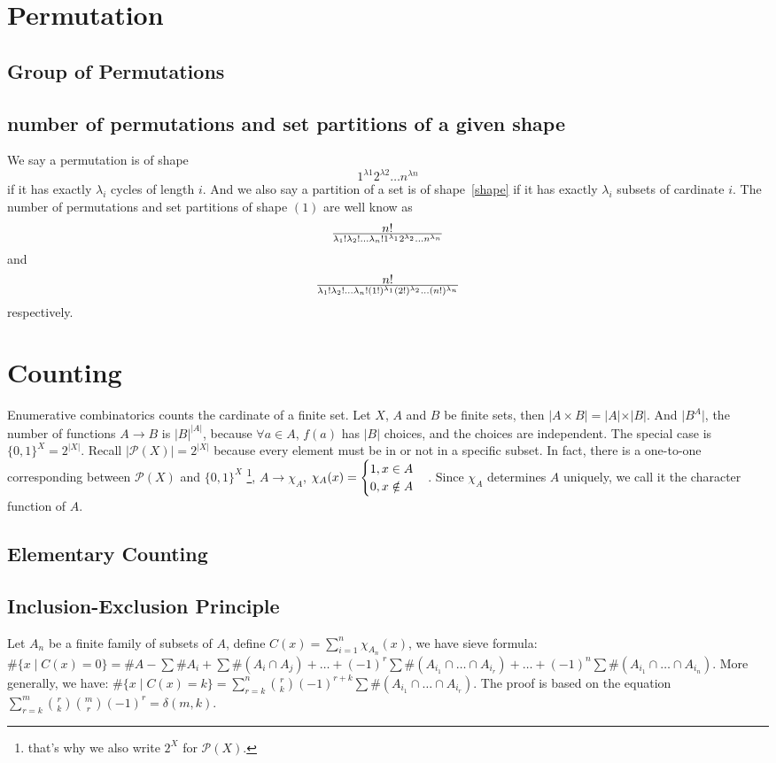 \section{Permutation}
\subsection{Group of Permutations}

\subsection{number of permutations and set partitions of a given shape}
We say a permutation is of shape
$$1^{\lambda 1}2^{\lambda 2} \dots n^{\lambda n} \label{shape}$$
if it has exactly $\lambda_i$ cycles of length $i$.
And we also say a partition of a set is of shape~\ref{shape}
if it has exactly $\lambda_i$ subsets of cardinate $i$.
The number of permutations and set partitions of shape $(1)$
are well know as
$$n! \over \lambda_1! \lambda_2! \dots \lambda_n!
		1^{\lambda_1} 2^{\lambda_2} \dots n^{\lambda_n}$$
and 
$$n! \over \lambda_1! \lambda_2! \dots \lambda_n!
		(1!)^{\lambda_1} (2!)^{\lambda_2} \dots (n!)^{\lambda_n}$$
respectively.

\section{Counting}
Enumerative combinatorics counts the cardinate of a finite set.
Let $X$, $A$ and $B$ be finite sets, then $\vert A\times B\vert=\vert A\vert \times \vert B\vert$.
And $\vert B^{A}\vert$, the number of functions $A\to B$ is $\vert B\vert^{\vert A\vert}$,
because $\forall a\in A$, $f(a)$ has $\vert B\vert$ choices, and the choices are independent.
The special case is $\{0,1\}^{X}=2^{\vert X\vert}$. Recall $\vert \mathcal{P}(X)\vert=2^{\vert X\vert}$
because every element must be in or not in a specific subset.
In fact, there is a one-to-one corresponding between $\mathcal{P}(X)$ and $\{0,1\}^{X}$
\footnote{that's why we also write $2^{X}$ for $\mathcal{P}(X)$.},
$A \to \chi_A$, $\chi_A(x)=\begin{cases}1, x\in A\cr 0, x\notin A\end{cases}$.
Since $\chi_A$ determines $A$ uniquely, we call it the character function of $A$.

\subsection{Elementary Counting}
\subsection{Inclusion-Exclusion Principle}
Let $A_n$ be a finite family of subsets of $A$,
define $C(x)=\sum_{i=1}^{n}\chi_{A_n}(x)$, 
we have sieve formula:
$\#\{x\mid C(x)=0\}=\#A - \sum\#A_i + \sum\#(A_i\cap A_j) + \dots
 + (-1)^r\sum\#(A_{i_1}\cap\dots\cap A_{i_r}) + \dots
 + (-1)^n\sum\#(A_{i_1}\cap\dots\cap A_{i_n})$.
More generally, we have:
$\#\{x\mid C(x)=k\}=\sum_{r=k}^{n}{r\choose k}(-1)^{r+k}\sum\#(A_{i_1}\cap \dots \cap A_{i_r})$.
The proof is based on the equation $\sum_{r=k}^{m}{r\choose k}{m\choose r}(-1)^r=\delta(m,k)$.

